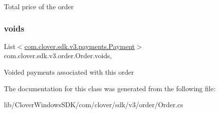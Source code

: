 Total price of the order 

\mbox{\label{classcom_1_1clover_1_1sdk_1_1v3_1_1order_1_1_order_afa873072e171007d2a63a9c84be27c25}} 
\subsubsection{\texorpdfstring{voids}{voids}}
{\footnotesize\ttfamily List$<$\hyperlink{classcom_1_1clover_1_1sdk_1_1v3_1_1payments_1_1_payment}{com.\+clover.\+sdk.\+v3.\+payments.\+Payment}$>$ com.\+clover.\+sdk.\+v3.\+order.\+Order.\+voids\hspace{0.3cm}{\ttfamily [get]}, {\ttfamily [set]}}



Voided payments associated with this order 



The documentation for this class was generated from the following file\+:\begin{DoxyCompactItemize}
\item 
lib/\+Clover\+Windows\+S\+D\+K/com/clover/sdk/v3/order/Order.\+cs\end{DoxyCompactItemize}
